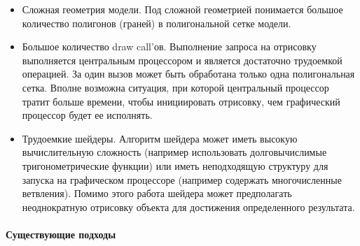 \begin{itemize}
    \item {
        Сложная геометрия модели. Под сложной геометрией понимается
        большое количество полигонов (граней) в полигональной сетке модели.
    }
    \item {
        Большое количество draw call'ов.
        Выполнение запроса на отрисовку выполняется центральным процессором и
        является достаточно трудоемкой операцией. За один вызов может быть
        обработана только одна полигональная сетка.
        Вполне возможна ситуация, при которой центральный процессор тратит больше времени,
        чтобы инициировать отрисовку, чем графический процессор будет ее исполнять.
    }
    \item {
        Трудоемкие шейдеры. Алгоритм шейдера может иметь
        высокую вычислительную сложность
        (например использовать долговычислимые тригонометрические функции) или
        иметь неподходящую структуру для запуска на графическом процессоре
        (например содержать многочисленные ветвления).
        Помимо этого работа шейдера может предполагать неоднократную
        отрисовку объекта для достижения определенного результата.
    }
\end{itemize}

\paragraph{Существующие подходы}

